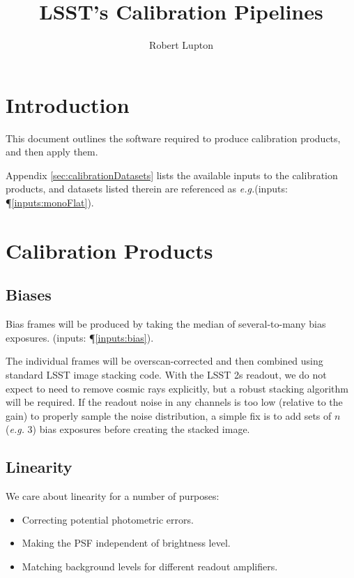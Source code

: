 \documentclass[12pt]{article}
\newcommand{\eg}{\textit{e.g.}\xspace}
\newcommand{\inputData}[1]{(inputs: \P \ref{inputs:#1})}
\begin{document}
\title{LSST's Calibration Pipelines}
\author{Robert Lupton}
\maketitle
\tableofcontents

\section{Introduction}

This document outlines the software required to produce calibration products, and then apply them.

Appendix \ref{sec:calibrationDatasets} lists the available inputs to the calibration products, and datasets
listed therein are referenced as \eg \inputData{monoFlat}.

\section{Calibration Products}

\subsection{Biases}

Bias frames will be produced by taking the median of several-to-many bias exposures.
\inputData{bias}.

The individual frames will be overscan-corrected and then combined using standard LSST image stacking code.
With the LSST 2s readout, we do not expect to need to remove cosmic rays explicitly, but a robust stacking algorithm will be required.  If the readout noise in any channels is too low (relative to the gain) to properly
sample the noise distribution, a simple fix is to add sets of $n$ (\eg 3) bias exposures before creating
the stacked image.

\subsection{Linearity}
\label{sec:linearity}

We care about linearity for a number of purposes:
\begin{itemize}
\item Correcting potential photometric errors.
\item Making the PSF independent of brightness level.
\item Matching background levels for different readout amplifiers.
\end{itemize}
\end{document}
